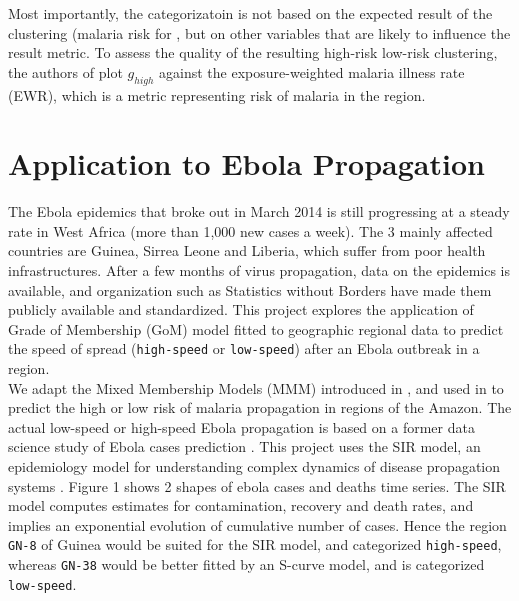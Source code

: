 \documentclass[twoside]{article}
\begin{document}
Most importantly, the categorizatoin is not based on the expected result of the clustering (malaria risk for \cite{malaria}, but on other variables that are likely to influence the result metric. To assess the quality of the resulting high-risk low-risk clustering, the authors of \cite{malaria} plot $g_{high}$ against the exposure-weighted malaria illness rate (EWR), which is a metric representing risk of malaria in the region.



\section{Application to Ebola Propagation}

The Ebola epidemics that broke out in March 2014 is still progressing at a steady rate in West Africa (more than 1,000 new cases a week). The 3 mainly affected countries are Guinea, Sirrea Leone and Liberia, which suffer from poor health infrastructures. After a few months of virus propagation, data on the epidemics is available, and organization such as Statistics without Borders have made them publicly available and standardized. This project explores the application of Grade of Membership (GoM) model fitted to geographic regional data to predict the speed of spread (\texttt{high-speed} or \texttt{low-speed}) after an Ebola outbreak in a region.\\

We adapt the Mixed Membership Models (MMM) introduced in \cite{mixmem}, and used in \cite{malaria} to predict the high or low risk of malaria propagation in regions of the Amazon. The actual low-speed or high-speed Ebola propagation is based on a former data science study of Ebola cases prediction \cite{ebolpred}. This project uses the SIR model, an epidemiology model for understanding complex dynamics of disease propagation systems \cite{sirwik}. Figure 1 shows 2 shapes of ebola cases and deaths time series. The SIR model computes estimates for contamination, recovery and death rates, and implies an exponential evolution of cumulative number of cases. Hence the region \texttt{GN-8} of Guinea would be suited for the SIR model, and categorized \texttt{high-speed}, whereas \texttt{GN-38} would be better fitted by an S-curve model, and is categorized \texttt{low-speed}.
\vspace{.1 in}
\end{document}
